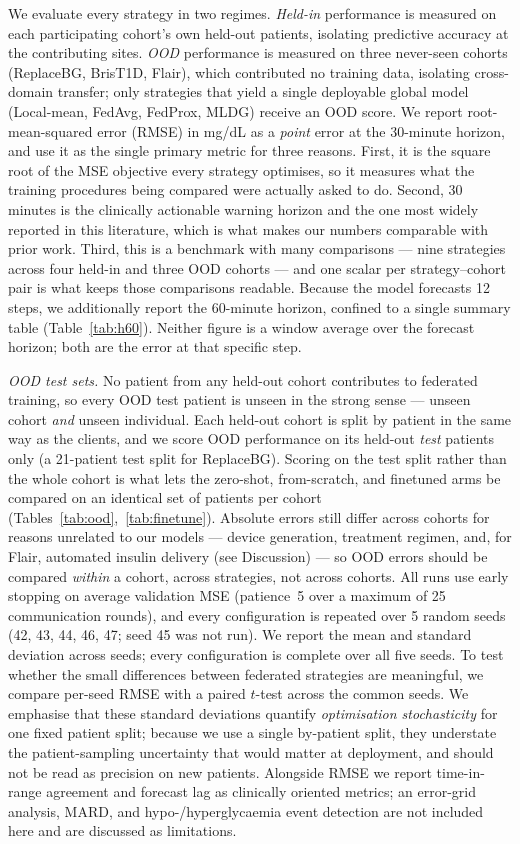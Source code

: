 \documentclass[10pt,letterpaper]{article}
\begin{document}
We evaluate every strategy in two regimes. \emph{Held-in} performance is measured
on each participating cohort's own held-out patients, isolating predictive
accuracy at the contributing sites. \emph{OOD} performance is measured on three
never-seen cohorts (ReplaceBG, BrisT1D, Flair), which contributed no training
data, isolating cross-domain transfer; only strategies that yield a single
deployable global model (Local-mean, FedAvg, FedProx, MLDG) receive an OOD score.
We report root-mean-squared error (RMSE) in mg/dL as a \emph{point} error at the
30-minute horizon, and use it as the single primary metric for three reasons.
First, it is the square root of the MSE objective every strategy optimises, so it
measures what the training procedures being compared were actually asked to do.
Second, 30 minutes is the clinically actionable warning horizon and the one most
widely reported in this literature, which is what makes our numbers comparable
with prior work. Third, this is a benchmark with many comparisons --- nine
strategies across four held-in and three OOD cohorts --- and one scalar per
strategy--cohort pair is what keeps those comparisons readable. Because the model
forecasts 12 steps, we additionally report the 60-minute horizon, confined to a
single summary table (Table~\ref{tab:h60}). Neither figure is a window average
over the forecast horizon; both are the error at that specific step.

\emph{OOD test sets.} No patient from any held-out cohort contributes to federated
training, so every OOD test patient is unseen in the strong sense --- unseen
cohort \emph{and} unseen individual. Each held-out cohort is split by patient in
the same way as the clients, and we score OOD performance on its held-out
\emph{test} patients only (a 21-patient test split for ReplaceBG). Scoring on the
test split rather than the whole cohort is what lets the zero-shot, from-scratch,
and finetuned arms be compared on an identical set of patients per cohort
(Tables~\ref{tab:ood},~\ref{tab:finetune}). Absolute errors still differ across
cohorts for reasons unrelated to our models --- device generation, treatment
regimen, and, for Flair, automated insulin delivery (see Discussion) --- so OOD
errors should be compared \emph{within} a cohort, across strategies, not across
cohorts. All runs use early stopping on average validation MSE (patience~5 over a
maximum of 25 communication rounds), and every configuration is repeated over 5
random seeds (42, 43, 44, 46, 47; seed 45 was not run). We report the mean and
standard deviation across seeds; every configuration is complete over all five
seeds. To test whether the small differences between federated
strategies are meaningful, we compare per-seed RMSE with a paired $t$-test across
the common seeds. We emphasise that these standard deviations quantify
\emph{optimisation stochasticity} for one fixed patient split; because we use a
single by-patient split, they understate the patient-sampling uncertainty that
would matter at deployment, and should not be read as precision on new patients.
Alongside RMSE we report time-in-range agreement and forecast lag as
clinically oriented metrics; an error-grid analysis, MARD, and
hypo-/hyperglycaemia event detection are not included here and are discussed as
limitations.
\end{document}
